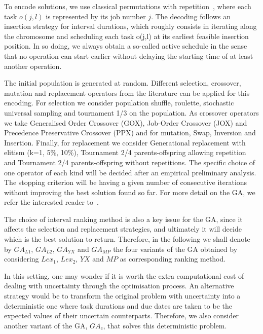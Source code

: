 \documentclass[12pt,halfline,a4paper]{ouparticle}
\begin{document}
To encode solutions, we use classical permutations with repetition~\cite{Bierwirth1995}, where each task $o(j, l)$ is represented by its job number $j$. The decoding follows an insertion strategy for interval durations, which roughly consists in iterating along the chromosome and scheduling each task o(j,l) at its earliest feasible insertion position.  In so doing,  we always obtain a so-called active schedule in the sense that no operation can start earlier without delaying the starting time of at least another operation.

The initial population is generated at random. Different selection, crossover, mutation and replacement operators from the literature can be applied for this encoding.  For selection we  consider population shuffle,  roulette, stochastic universal sampling and tournament 1/3 on the population. As crossover operators we take Generalised Order Crossover (GOX), Job-Order Cross\-over (JOX) and Precedence Preservative Crossover (PPX) and for mutation,  Swap, Inversion and Insertion. Finally, for replacement we consider Generational replacement with elitism (k=1, 5\%, 10\%), Tournament 2/4 parents-offspring allowing repetition and Tournament 2/4 parents-offspring without repetitions.  The specific choice of one operator of each kind will be decided after an empirical preliminary analysis.  The stopping criterion will be having a given number of consecutive iterations without improving the best solution found so far. For more detail on the GA, we refer the interested reader to~\cite{Diaz2020}.


The choice of interval ranking method is also a key issue for the GA, since it affects the selection and replacement strategies, and ultimately it will decide which is the best solution to return.  Therefore, in the following we shall denote by $GA_{L1}$, $GA_{L2}$, $GA_{YX}$ and $GA_{MP}$ the four variants of the GA obtained by considering $Lex_1$, $Lex_2$, $YX$ and $MP$ as corresponding ranking method. 

In this setting, one may wonder if it is worth the extra computational cost of dealing with uncertainty through the optimisation process. An alternative strategy would be to transform the original problem with uncertainty into a deterministic one where task durations and due dates are taken to be the expected values of their uncertain counterparts. Therefore, we also consider another variant of the GA, $GA_c$, that solves this deterministic problem.
\end{document}

